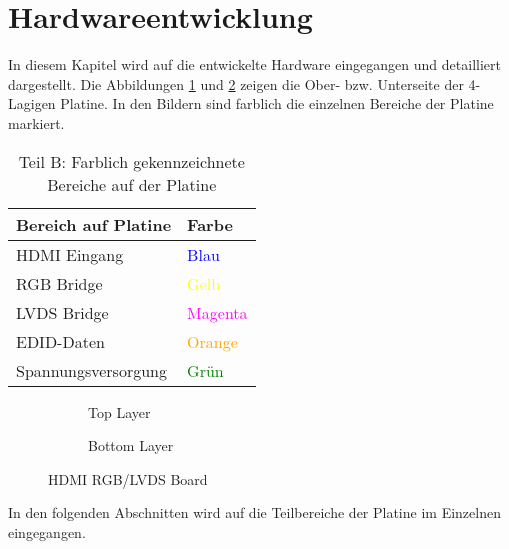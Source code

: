\section{Hardwareentwicklung}
\label{sec:TeilB_Hardware}
In diesem Kapitel wird auf die entwickelte Hardware eingegangen und detailliert dargestellt. Die Abbildungen \ref{fig:teilb_pcb_top} und \ref{fig:teilb_pcb_bot} zeigen die Ober- bzw. Unterseite der 4-Lagigen Platine. In den Bildern sind farblich die einzelnen Bereiche der Platine markiert. 

\begin{table}[h]
\begin{tabular}{|p{8cm}|p{5.5cm}|}\hline
\rowcolor{TableBackgroundColor} 
   \textbf{Bereich auf Platine} & \textbf{Farbe}\\ \hline
  HDMI Eingang &  \textcolor{blue}{Blau} \\ \hline
  RGB Bridge & \textcolor{yellow}{Gelb} \\ \hline
  LVDS Bridge & \textcolor{magenta}{Magenta}  \\ \hline
  EDID-Daten &  \textcolor{orange}{Orange} \\ \hline
  Spannungsversorgung &  \textcolor{green}{Grün} \\ \hline 
\end{tabular}
\caption{Teil B: Farblich gekennzeichnete Bereiche auf der Platine}
\label{tab:pcb_areas}
\end{table}

\begin{figure}[htbp]
        \centering
        \begin{subfigure}[htp]{0.48\textwidth}
                \caption{Top Layer}
                \label{fig:teilb_pcb_top}
        \end{subfigure}
\quad 
        \begin{subfigure}[htp]{0.48\textwidth}
                             				\caption{Bottom Layer}
                \label{fig:teilb_pcb_bot}
        \end{subfigure}
        \caption{HDMI RGB/LVDS Board}
        \label{fig:teilb_pcb}
\end{figure}

In den folgenden Abschnitten wird auf die Teilbereiche der Platine im Einzelnen eingegangen. 

